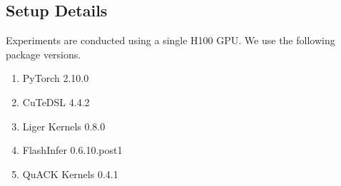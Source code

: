 \subsection{Setup Details}
\label{sec:setup-details}
Experiments are conducted using a single H100 GPU. We use the following package versions.
\begin{enumerate}
    \item PyTorch 2.10.0
    \item CuTeDSL 4.4.2
    \item Liger Kernels 0.8.0
    \item FlashInfer 0.6.10.post1
    \item QuACK Kernels 0.4.1
\end{enumerate}


